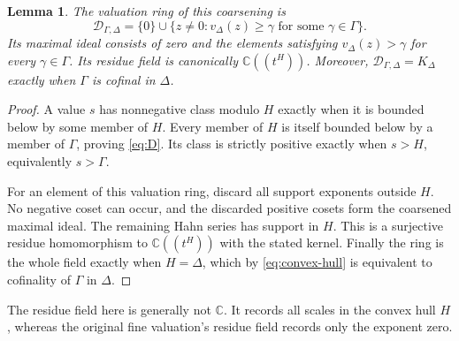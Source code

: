 \documentclass[11pt,letterpaper]{article}
\numberwithin{equation}{section}
\newtheorem{lemma}[theorem]{Lemma}
\theoremstyle{definition}
\theoremstyle{remark}
\newcommand{\C}{\mathbb C}
\begin{document}
\begin{lemma}\label{lem:coarsened-ring}
The valuation ring of this coarsening is
\begin{equation}\label{eq:D}
 \mathcal D_{\Gamma,\Delta}
 =\{0\}\cup\{z\ne0:v_\Delta(z)\ge\gamma
                       \text{ for some }\gamma\in\Gamma\}.
\end{equation}
Its maximal ideal consists of zero and the elements satisfying
$v_\Delta(z)>\gamma$ for every $\gamma\in\Gamma$.
Its residue field is canonically $\C((t^H))$. Moreover,
$\mathcal D_{\Gamma,\Delta}=K_\Delta$ exactly when $\Gamma$ is cofinal in
$\Delta$.
\end{lemma}
\begin{proof}
A value $s$ has nonnegative class modulo $H$ exactly when it is bounded below
by some member of $H$. Every member of $H$ is itself bounded below by a
member of $\Gamma$, proving \eqref{eq:D}. Its class is strictly positive
exactly when $s>H$, equivalently $s>\Gamma$.

For an element of this valuation ring, discard all support exponents outside
$H$. No negative coset can occur, and the discarded positive cosets form the
coarsened maximal ideal. The remaining Hahn series has support in $H$.
This is a surjective residue homomorphism to $\C((t^H))$ with the stated
kernel. Finally the ring is the whole field exactly when $H=\Delta$, which
by \eqref{eq:convex-hull} is equivalent to cofinality of $\Gamma$ in $\Delta$.
\end{proof}

The residue field here is generally not $\C$. It records all scales in the
convex hull $H$, whereas the original fine valuation's residue field records
only the exponent zero.
\end{document}
